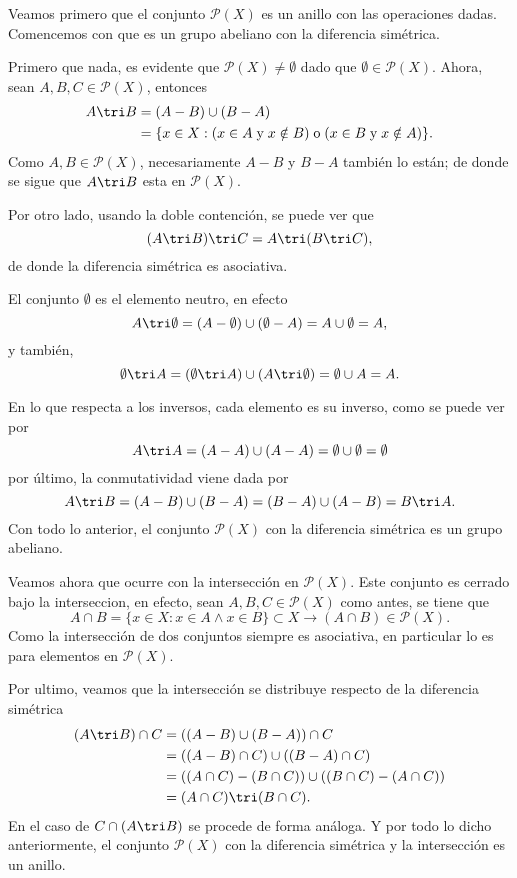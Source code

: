 	\begin{sol}
		Veamos primero que el conjunto $\mathcal{P}(X)$ es un anillo con las operaciones dadas. Comencemos con que es un grupo abeliano con la diferencia simétrica. 
		
		Primero que nada, es evidente que $\mathcal{P}(X) \neq \emptyset$ dado que $\emptyset \in \mathcal{P}(X)$. Ahora, sean $A,B,C \in \mathcal{P}(X)$, entonces 
		\begin{align*}
		A \tri B &= (A-B) \cup (B-A) \\
				 &= \{ x \in X: (x \in A \; \text{y} \; x \notin B) \; \text{o} \; (x \in B \; \text{y} \; x\notin A ) \}. 
		\end{align*}
		Como $A,B \in \mathcal{P}(X)$, necesariamente $A - B$ y $B - A$ también lo están; de donde se sigue que $A \tri B$ esta en $\mathcal{P}(X)$. 
		
		Por otro lado, usando la doble contención, se puede ver que 
		\[ (A \tri B) \tri C = A \tri (B \tri C), \]
		de donde la diferencia simétrica es asociativa. 
		
		El conjunto $\emptyset$ es el elemento neutro, en efecto
		\[ A \tri \emptyset = (A - \emptyset) \cup (\emptyset - A) = A \cup \emptyset = A, \] y también,
		\[ \emptyset \tri A = (\emptyset \tri A) \cup (A \tri \emptyset) = \emptyset \cup A = A. \] 
		
		En lo que respecta a los inversos, cada elemento es su inverso, como se puede ver por
		\[ A \tri A = (A-A) \cup (A-A) = \emptyset \cup \emptyset = \emptyset \]
		por último, la conmutatividad viene dada por
		\[ A \tri B = (A-B) \cup (B-A) = (B-A) \cup (A-B) = B \tri A. \]
		Con todo lo anterior, el conjunto $\mathcal{P}(X)$ con la diferencia simétrica es un grupo abeliano. 
		
		Veamos ahora que ocurre con la intersección en $\mathcal{P}(X)$. Este conjunto es cerrado bajo la interseccion, en efecto, sean $A,B,C \in \mathcal{P}(X)$ como antes, se tiene que 
		\[ A \cap B = \{x \in X: x \in A \wedge x \in B \} \subset X \rightarrow (A \cap B) \in \mathcal{P}(X). \]
		Como la intersección de dos conjuntos siempre es asociativa, en particular lo es para elementos en $\mathcal{P}(X)$. 
		
		Por ultimo, veamos que la intersección se distribuye respecto de la diferencia simétrica
		\begin{align*}
		(A \tri B) \cap C &= ((A - B) \cup (B - A)) \cap C \\
		&= ((A-B) \cap C) \cup ((B-A) \cap C) \\
		&= ((A \cap C) - (B \cap C)) \cup ((B \cap C) - (A \cap C)) \\
		&= (A \cap C) \tri (B \cap C).
		\end{align*}
		En el caso de $C \cap (A \tri B)$ se procede de forma análoga. Y por todo lo dicho anteriormente, el conjunto $\mathcal{P}(X)$ con la diferencia simétrica y la intersección es un anillo. 
		

\end{sol}
